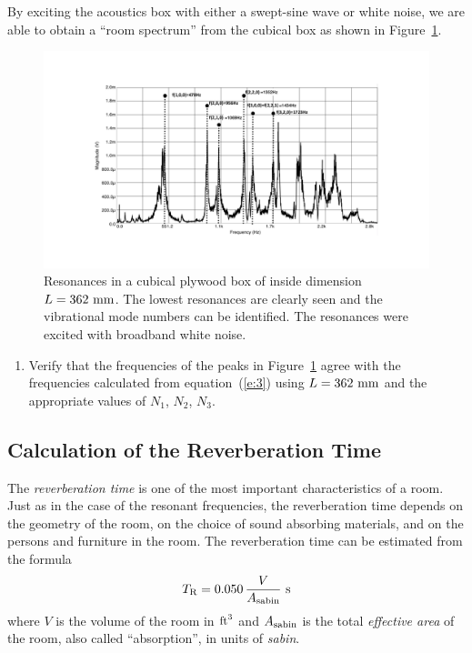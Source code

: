 \documentclass[11pt]{NSF}
\def\be{\begin{equation}}
\def\ee{\end{equation}}
\def\ben{\begin{enumerate}}
\def\een{\end{enumerate}}
\begin{document}
By exciting the acoustics box with either a swept-sine wave 
or white noise, we are able to obtain a ``room spectrum” from 
the cubical box as shown in Figure~\ref{f:2}. 
%
\begin{figure}[hbtp]
\begin{center}
\includegraphics[width=.9\textwidth]{fig8_2}
\caption{Resonances in a cubical plywood box of inside dimension 
$L = 362~{\rm mm}$. 
The lowest resonances are clearly seen and the vibrational mode
numbers can be identified.
The resonances were excited with broadband white noise.}
\label{f:2}
\end{center}
\end{figure}
%

\ben
\item
Verify that the frequencies of the peaks in Figure~\ref{f:2} 
agree with the frequencies calculated from equation~(\ref{e:3}) using 
$L=362~{\rm mm}$ and the appropriate values of $N_1$, $N_2$, $N_3$.

\een

\subsection{Calculation of the Reverberation Time}

The {\em reverberation time} is one of the most important characteristics of
a room. Just as in the case of the resonant frequencies, the
reverberation time depends on the geometry of the room, on the choice of
sound absorbing materials, and on the persons and furniture in the room.
The reverberation time can be estimated from the formula 
%
\be
T_{\rm R} = 0.050\,\frac{V}{A_{\rm sabin}}~{\rm s}
\label{e:TR}
\ee
%
where $V$ is the volume of the room in ${\rm ft}^3$ and $A_{\rm
sabin}$ is the total {\em effective area} of the room, also called
``absorption”, in units of {\em sabin}. 
\end{document}

